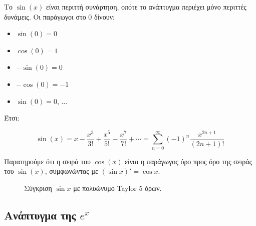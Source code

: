 \documentclass[a4paper, 11pt]{article}
\providecommand{\tightlist}{\setlength{\itemsep}{0pt}\setlength{\parskip}{0pt}}
\begin{document}
Το \(\sin(x)\) είναι περιττή συνάρτηση, οπότε το ανάπτυγμα περιέχει μόνο
περιττές δυνάμεις. Οι παράγωγοι στο \(0\) δίνουν:

\begin{itemize}
\tightlist
\item
  \(\sin(0)=0\)
\item
  \(\cos(0)=1\)
\item
  \(-\sin(0)=0\)
\item
  \(-\cos(0)=-1\)
\item
  \(\sin(0)=0\), \(\dots\)
\end{itemize}

Έτσι:

\[
\sin(x) = x - \frac{x^3}{3!} + \frac{x^5}{5!} - \frac{x^7}{7!} + \cdots = \sum_{n=0}^{\infty} (-1)^n \frac{x^{2n+1}}{(2n+1)!}
\]

Παρατηρούμε ότι η σειρά του \(\cos(x)\) είναι η παράγωγος όρο προς όρο
της σειράς του \(\sin(x)\), συμφωνώντας με \((\sin x)' = \cos x\).

\begin{figure}[htbp]
\centering
{}
\caption{Σύγκριση $\sin x$ με πολυώνυμο Taylor 5 όρων.}
\label{fig:sintaylor}
\end{figure}

\subsection{\texorpdfstring{Ανάπτυγμα της
\(e^x\)}{Ανάπτυγμα της e\^{}x}}\label{ux3b1ux3bdux3acux3c0ux3c4ux3c5ux3b3ux3bcux3b1-ux3c4ux3b7ux3c2-ex}
\end{document}
